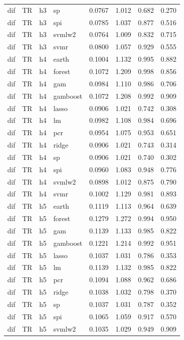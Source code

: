 \begin{ThreePartTable}
\begin{longtable}[t]{llclcccc}
dif & TR & h3 & sp & 0.0767 & 1.012 & 0.682 & 0.270\\
dif & TR & h3 & spi & 0.0785 & 1.037 & 0.877 & 0.516\\
dif & TR & h3 & svmlw2 & 0.0764 & 1.009 & 0.832 & 0.715\\
dif & TR & h3 & svmr & 0.0800 & 1.057 & 0.929 & 0.555\\
\addlinespace
dif & TR & h4 & earth & 0.1004 & 1.132 & 0.995 & 0.882\\
dif & TR & h4 & forest & 0.1072 & 1.209 & 0.998 & 0.856\\
dif & TR & h4 & gam & 0.0984 & 1.110 & 0.986 & 0.706\\
dif & TR & h4 & gamboost & 0.1072 & 1.208 & 0.992 & 0.909\\
dif & TR & h4 & lasso & 0.0906 & 1.021 & 0.742 & 0.308\\
dif & TR & h4 & lm & 0.0982 & 1.108 & 0.984 & 0.696\\
dif & TR & h4 & pcr & 0.0954 & 1.075 & 0.953 & 0.651\\
dif & TR & h4 & ridge & 0.0906 & 1.021 & 0.743 & 0.314\\
dif & TR & h4 & sp & 0.0906 & 1.021 & 0.740 & 0.302\\
dif & TR & h4 & spi & 0.0960 & 1.083 & 0.948 & 0.776\\
dif & TR & h4 & svmlw2 & 0.0898 & 1.012 & 0.875 & 0.790\\
dif & TR & h4 & svmr & 0.1002 & 1.129 & 0.981 & 0.893\\
\addlinespace
dif & TR & h5 & earth & 0.1119 & 1.113 & 0.964 & 0.639\\
dif & TR & h5 & forest & 0.1279 & 1.272 & 0.994 & 0.950\\
dif & TR & h5 & gam & 0.1139 & 1.133 & 0.985 & 0.822\\
dif & TR & h5 & gamboost & 0.1221 & 1.214 & 0.992 & 0.951\\
dif & TR & h5 & lasso & 0.1037 & 1.031 & 0.786 & 0.353\\
dif & TR & h5 & lm & 0.1139 & 1.132 & 0.985 & 0.822\\
dif & TR & h5 & pcr & 0.1094 & 1.088 & 0.962 & 0.686\\
dif & TR & h5 & ridge & 0.1038 & 1.032 & 0.798 & 0.370\\
dif & TR & h5 & sp & 0.1037 & 1.031 & 0.787 & 0.352\\
dif & TR & h5 & spi & 0.1065 & 1.059 & 0.917 & 0.570\\
dif & TR & h5 & svmlw2 & 0.1035 & 1.029 & 0.949 & 0.909\\

\end{longtable}
\end{ThreePartTable}
